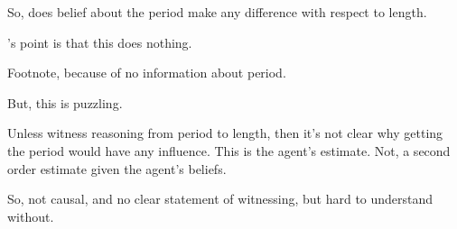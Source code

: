 \begin{note}
  So, does belief about the period make any difference with respect to length.

  \citeauthor{Tolliver:1982us}'s point is that this does nothing.

  Footnote, because of no information about period.

  But, this is puzzling.

  Unless witness reasoning from period to length, then it's not clear why getting the period would have any influence.
  This is the agent's estimate.
  Not, a second order estimate given the agent's beliefs.

  So, not causal, and no clear statement of witnessing, but hard to understand without.
\end{note}


